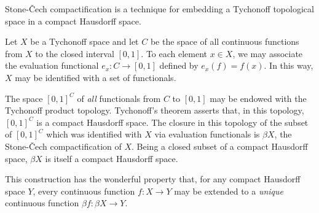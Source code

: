 \documentclass[12pt]{article}
\begin{document}
Stone-\v Cech compactification is a technique for embedding a Tychonoff topological space in a compact Hausdorff space.

Let $X$ be a Tychonoff space and let $C$ be the space of all continuous functions from $X$ to the closed interval $[0,1]$.  To each element $x \in X$, we may associate the evaluation functional $e_x \colon C \to [0,1]$ defined by $e_x (f) = f(x)$.  In this way, $X$ may be identified with a set of functionals.

The space $[0,1]^C$ of \emph{all} functionals from $C$ to $[0,1]$ may be endowed with the Tychonoff product topology.  Tychonoff's theorem asserts that, in this topology, $[0,1]^C$ is a compact Hausdorff space.  The closure in this topology of the subset of $[0,1]^C$ which was identified with $X$ via evaluation functionals is $\beta X$, the Stone-\v Cech compactification of $X$.
Being a closed subset of a compact Hausdorff space, $\beta X$ is itself a compact Hausdorff space.

This construction has the wonderful property that, for any compact Hausdorff space $Y$, every continuous function $f \colon X \to Y$ may be extended to a \emph{unique} continuous function $\beta f \colon \beta X \to Y$.
\end{document}

